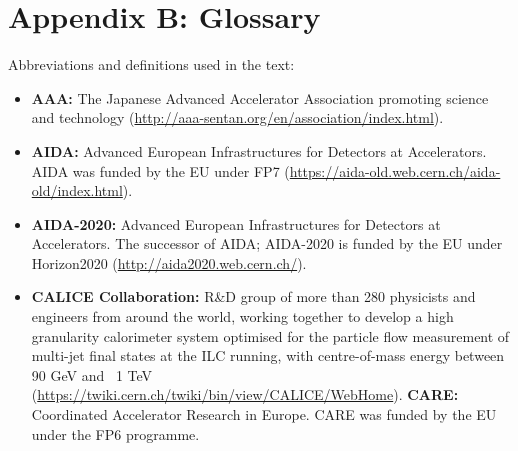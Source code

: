 \documentclass[%
 reprint,
 floatfix,
 amsmath,amssymb,
 aps,
]{revtex4-1}
\begin{document}
\section*{\label{Appendix4} \Large{Appendix B: Glossary} }
Abbreviations and definitions used in the text:
\begin{itemize}
\item
\textbf{AAA:} The Japanese Advanced Accelerator Association promoting science and technology (\url{http://aaa-sentan.org/en/association/index.html}).
\item
\textbf{AIDA:} Advanced European Infrastructures for Detectors at Accelerators. AIDA was funded by the EU under FP7 (\url{https://aida-old.web.cern.ch/aida-old/index.html}).
\item
\textbf{AIDA-2020:} Advanced European Infrastructures for Detectors at Accelerators. The successor of AIDA; AIDA-2020 is funded by the EU under Horizon2020 (\url{http://aida2020.web.cern.ch/}).
\item
\textbf{CALICE Collaboration:} R\&D group of more than 280 physicists and engineers from around the world, working together to develop a high granularity calorimeter system optimised for the particle flow measurement of multi-jet final states at the ILC running, with centre-of-mass energy between 90 GeV and ~1 TeV (\url{https://twiki.cern.ch/twiki/bin/view/CALICE/WebHome}).
\textbf{CARE:} Coordinated Accelerator Research in Europe. CARE was funded by the EU under the FP6 programme.


\end{itemize}
\end{document}
